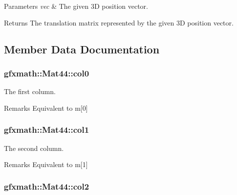 \begin{DoxyParams}{Parameters}
{\em vec} & The given 3\+D position vector.\\
\hline
\end{DoxyParams}
\begin{DoxyReturn}{Returns}
The translation matrix represented by the given 3\+D position vector. 
\end{DoxyReturn}


\subsection{Member Data Documentation}
\hypertarget{classgfxmath_1_1_mat44_a14a9f934c2487a5dd9e4702a0b539cb4}{}
\subsubsection[{col0}]{ gfxmath\+::\+Mat44\+::col0}\label{classgfxmath_1_1_mat44_a14a9f934c2487a5dd9e4702a0b539cb4}


The first column. 

\begin{DoxyRemark}{Remarks}
Equivalent to m\mbox{[}0\mbox{]} 
\end{DoxyRemark}
\hypertarget{classgfxmath_1_1_mat44_a9ac4cf40ac05a9ad94964d247d8256e1}{}
\subsubsection[{col1}]{ gfxmath\+::\+Mat44\+::col1}\label{classgfxmath_1_1_mat44_a9ac4cf40ac05a9ad94964d247d8256e1}


The second column. 

\begin{DoxyRemark}{Remarks}
Equivalent to m\mbox{[}1\mbox{]} 
\end{DoxyRemark}
\hypertarget{classgfxmath_1_1_mat44_aa810627c4b5df8432b36befdd4649763}{}
\subsubsection[{col2}]{ gfxmath\+::\+Mat44\+::col2}\label{classgfxmath_1_1_mat44_aa810627c4b5df8432b36befdd4649763}


